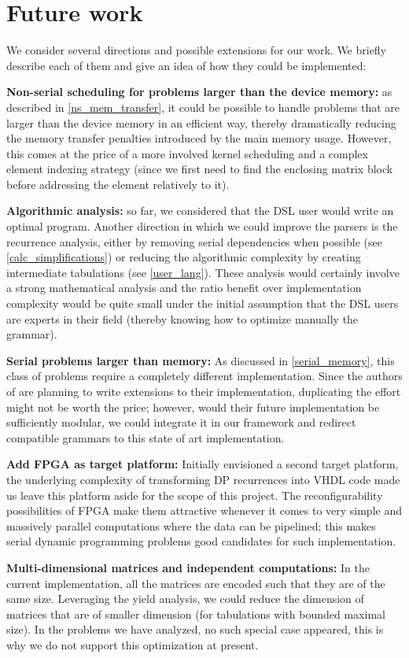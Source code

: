\section{Future work}
We consider several directions and possible extensions for our work. We briefly describe each of them and give an idea of how they could be implemented:\ol
\item \textbf{Non-serial scheduling for problems larger than the device memory:} as described in \ref{ns_mem_transfer}, it could be possible to handle problems that are larger than the device memory in an efficient way, thereby dramatically reducing the memory transfer penalties introduced by the main memory usage. However, this comes at the price of a more involved kernel scheduling and a complex element indexing strategy (since we first need to find the enclosing matrix block before addressing the element relatively to it).
\item \textbf{Algorithmic analysis:} so far, we considered that the DSL user would write an optimal program. Another direction in which we could improve the parsers is the recurrence analysis, either by removing serial dependencies when possible (see \ref{calc_simplifications}) or reducing the algorithmic complexity by creating intermediate tabulations (see \ref{user_lang}). These analysis would certainly involve a strong mathematical analysis and the ratio benefit over implementation complexity would be quite small under the initial assumption that the DSL users are experts in their field (thereby knowing how to optimize manually the grammar).
\item \textbf{Serial problems larger than memory:} As discussed in \ref{serial_memory}, this class of problems require a completely different implementation. Since the authors of \cite{swat_mega} are planning to write extensions to their implementation, duplicating the effort might not be worth the price; however, would their future implementation be sufficiently modular, we could integrate it in our framework and redirect compatible grammars to this state of art implementation.
\item \textbf{Add FPGA as target platform:} Initially envisioned a second target platform, the underlying complexity of transforming DP recurrences into VHDL code made us leave this platform aside for the scope of this project. The reconfigurability possibilities of FPGA make them attractive whenever it comes to very simple and massively parallel computations where the data can be pipelined; this makes serial dynamic programming problems good candidates for such implementation.
\item \textbf{Multi-dimensional matrices and independent computations:} In the current implementation, all the matrices are encoded such that they are of the same size. Leveraging the yield analysis, we could reduce the dimension of matrices that are of smaller dimension (for tabulations with bounded maximal size). In the problems we have analyzed, no such special case appeared, this is why we do not support this optimization at present.


